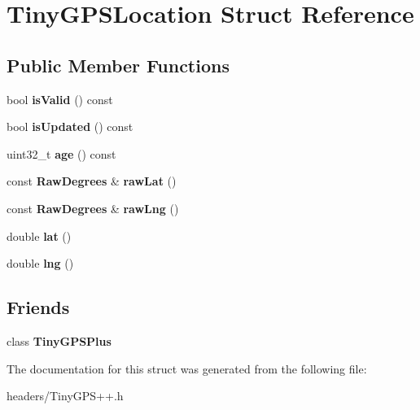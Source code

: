 \section{Tiny\+G\+P\+S\+Location Struct Reference}
\label{struct_tiny_g_p_s_location}
\subsection*{Public Member Functions}
\begin{DoxyCompactItemize}
\item 
bool {\bfseries is\+Valid} () const \label{struct_tiny_g_p_s_location_a783c2898915440f51a6df233aba51923}

\item 
bool {\bfseries is\+Updated} () const \label{struct_tiny_g_p_s_location_a9aae0a5fd73c2dab231309f1dd3b2c0a}

\item 
uint32\+\_\+t {\bfseries age} () const \label{struct_tiny_g_p_s_location_ada111e1b74f82dc029c0c61241424ca8}

\item 
const {\bf Raw\+Degrees} \& {\bfseries raw\+Lat} ()\label{struct_tiny_g_p_s_location_abe2a4fbfe28299aae87c5b4c3c58bcad}

\item 
const {\bf Raw\+Degrees} \& {\bfseries raw\+Lng} ()\label{struct_tiny_g_p_s_location_a9fe126feca0bdcfa9224a428b86d68db}

\item 
double {\bfseries lat} ()\label{struct_tiny_g_p_s_location_a86c3acea4f317b427eebb667e4d05a49}

\item 
double {\bfseries lng} ()\label{struct_tiny_g_p_s_location_a544e9009a5580b2fd5466821a5e5b782}

\end{DoxyCompactItemize}
\subsection*{Friends}
\begin{DoxyCompactItemize}
\item 
class {\bfseries Tiny\+G\+P\+S\+Plus}\label{struct_tiny_g_p_s_location_a6501fd5ef19ae166d43e0e5781609ee2}

\end{DoxyCompactItemize}


The documentation for this struct was generated from the following file\+:\begin{DoxyCompactItemize}
\item 
headers/Tiny\+G\+P\+S++.\+h\end{DoxyCompactItemize}
